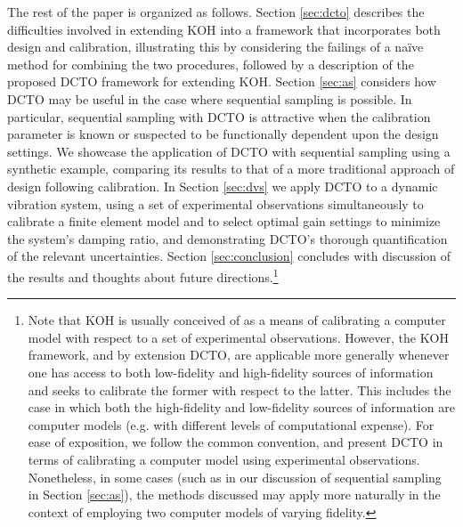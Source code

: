 \documentclass[twocolumn,10pt]{asme2ej}
\begin{document}
%
The rest of the paper is organized as follows.
%
Section \ref{sec:dcto} describes the difficulties involved in extending KOH into a framework that incorporates both design and calibration, illustrating this by considering the failings of a na\"ive method for combining the two procedures, followed by a description of the proposed DCTO framework for extending KOH.
%
%
Section \ref{sec:as} considers how DCTO may be useful in the case where sequential sampling is possible.
%
In particular, sequential sampling with DCTO is attractive when the calibration parameter is known or suspected to be functionally dependent upon the design settings.
%
We showcase the application of DCTO with sequential sampling using a synthetic example, comparing its results to that of a more traditional approach of design following calibration.
%
In Section \ref{sec:dvs} we apply DCTO to a dynamic vibration system, using a set of experimental observations simultaneously to calibrate a finite element model and to select optimal gain settings to minimize the system's damping ratio, and demonstrating DCTO's thorough quantification of the relevant uncertainties.
%
Section \ref{sec:conclusion} concludes with discussion of the results and thoughts about future directions.\footnote{
%
Note that KOH is usually conceived of as a means of calibrating a computer model with respect to a set of experimental observations.
%
However, the KOH framework, and by extension DCTO, are applicable more generally whenever one has access to both low-fidelity and high-fidelity sources of information and seeks to calibrate the former with respect to the latter.
%
This includes the case in which both the high-fidelity and low-fidelity sources of information are computer models (e.g. with different levels of computational expense).
%
For ease of exposition, we follow the common convention, and present DCTO in terms of calibrating a computer model using experimental observations.
%
Nonetheless, in some cases (such as in our discussion of sequential sampling in Section \ref{sec:as}), the methods discussed may apply more naturally in the context of employing two computer models of varying fidelity.
%
}
%

%
\end{document}
